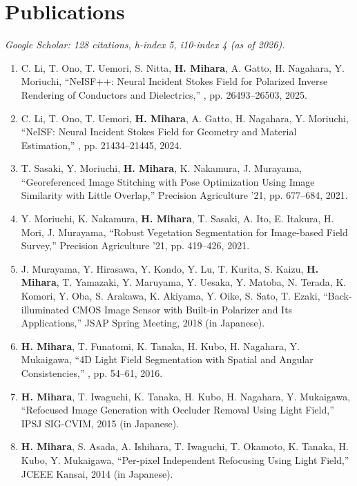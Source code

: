 \documentclass[a4paper,11pt]{article}
\begin{document}
\section{Publications}
 {\small\itshape Google Scholar: 128 citations, h-index 5, i10-index 4 (as of 2026).}\vspace{2pt}
 \begin{enumerate}[leftmargin=0.6cm]
   \small
   \item C. Li, T. Ono, T. Uemori, S. Nitta, \textbf{H. Mihara}, A. Gatto, H. Nagahara, Y. Moriuchi, ``NeISF++: Neural Incident Stokes Field for Polarized Inverse Rendering of Conductors and Dielectrics,'' \underline{}, pp. 26493--26503, 2025.
   \item C. Li, T. Ono, T. Uemori, \textbf{H. Mihara}, A. Gatto, H. Nagahara, Y. Moriuchi, ``NeISF: Neural Incident Stokes Field for Geometry and Material Estimation,'' \underline{}, pp. 21434--21445, 2024.
   \item T. Sasaki, Y. Moriuchi, \textbf{H. Mihara}, K. Nakamura, J. Murayama, ``Georeferenced Image Stitching with Pose Optimization Using Image Similarity with Little Overlap,'' Precision Agriculture '21, pp. 677--684, 2021.
   \item Y. Moriuchi, K. Nakamura, \textbf{H. Mihara}, T. Sasaki, A. Ito, E. Itakura, H. Mori, J. Murayama, ``Robust Vegetation Segmentation for Image-based Field Survey,'' Precision Agriculture '21, pp. 419--426, 2021.
   \item J. Murayama, Y. Hirasawa, Y. Kondo, Y. Lu, T. Kurita, S. Kaizu, \textbf{H. Mihara}, T. Yamazaki, Y. Maruyama, Y. Uesaka, Y. Matoba, N. Terada, K. Komori, Y. Oba, S. Arakawa, K. Akiyama, Y. Oike, S. Sato, T. Ezaki, ``Back-illuminated CMOS Image Sensor with Built-in Polarizer and Its Applications,'' JSAP Spring Meeting, 2018 (in Japanese).
   \item \textbf{H. Mihara}, T. Funatomi, K. Tanaka, H. Kubo, H. Nagahara, Y. Mukaigawa, ``4D Light Field Segmentation with Spatial and Angular Consistencies,'' \underline{}, pp. 54--61, 2016.
   \item \textbf{H. Mihara}, T. Iwaguchi, K. Tanaka, H. Kubo, H. Nagahara, Y. Mukaigawa, ``Refocused Image Generation with Occluder Removal Using Light Field,'' IPSJ SIG-CVIM, 2015 (in Japanese).
   \item \textbf{H. Mihara}, S. Asada, A. Ishihara, T. Iwaguchi, T. Okamoto, K. Tanaka, H. Kubo, Y. Mukaigawa, ``Per-pixel Independent Refocusing Using Light Field,'' JCEEE Kansai, 2014 (in Japanese).
 \end{enumerate}
\end{document}
